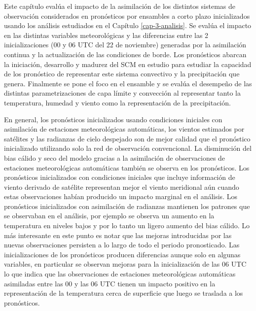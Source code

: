 \documentclass[12pt,oneside,a4paper]{reedthesis}
\begin{document}
Este capítulo evalúa el impacto de la asimilación de los distintos sistemas de observación considerados en pronósticos por ensambles a corto plazo inicializados usando los análisis estudiados en el Capítulo \ref{cap-3-analisis}. Se evalúa el impacto en las distintas variables meteorológicas y las diferencias entre las 2 inicializaciones (00 y 06 UTC del 22 de noviembre) generadas por la asimilación continua y la actualización de las condiciones de borde. Los pronósticos abarcan la iniciación, desarrollo y madurez del SCM en estudio para estudiar la capacidad de los pronóstico de representar este sistema convectivo y la precipitación que genera. Finalmente se pone el foco en el ensamble y se evalúa el desempeño de las distintas parametrizaciones de capa límite y convección al representar tanto la temperatura, humedad y viento como la representación de la precipitación.

En general, los pronósticos inicializados usando condiciones iniciales con asimilación de estaciones meteorológicas automáticas, los vientos estimados por satélites y las radianzas de cielo despejado son de mejor calidad que el pronóstico inicializado utilizando solo la red de observación convencional. La disminución del bias cálido y seco del modelo gracias a la asimilación de observaciones de estaciones meteorológicas automáticas también se observa en los pronósticos. Los pronósticos inicializados con condiciones iniciales que incluye información de viento derivado de satélite representan mejor el viento meridional aún cuando estas observaciones habían producido un impacto marginal en el análisis. Los pronósticos inicializados con asimilación de radianzas mantienen los patrones que se observaban en el análisis, por ejemplo se observa un aumento en la temperatura en niveles bajos y por lo tanto un ligero aumento del bias cálido. Lo más interesante en este punto es notar que las mejoras introducidas por las nuevas observaciones persisten a lo largo de todo el periodo pronosticado. Las inicializaciones de los pronósticos producen diferencias aunque solo en algunas variables, en particular se observan mejoras para la inicialización de las 06 UTC lo que indica que las observaciones de estaciones meteorológicas automáticas asimiladas entre las 00 y las 06 UTC tienen un impacto positivo en la representación de la temperatura cerca de superficie que luego se traslada a los pronósticos.
\end{document}
